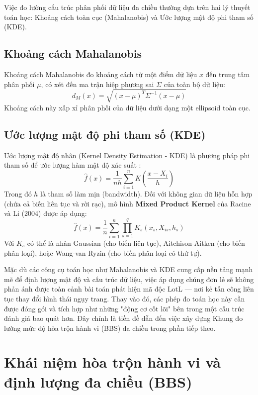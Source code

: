 \documentclass[../main.tex]{subfiles}
\begin{document}
Việc đo lường cấu trúc phân phối dữ liệu đa chiều thường dựa trên hai lý thuyết toán học: Khoảng cách toàn cục (Mahalanobis) và Ước lượng mật độ phi tham số (KDE).

\subsection{Khoảng cách Mahalanobis}
Khoảng cách Mahalanobis đo khoảng cách từ một điểm dữ liệu $x$ đến trung tâm phân phối $\mu$, có xét đến ma trận hiệp phương sai $\Sigma$ của toàn bộ dữ liệu:
\begin{equation}
    d_M(x) = \sqrt{(x - \mu)^T \Sigma^{-1} (x - \mu)}
\end{equation}
Khoảng cách này xấp xỉ phân phối của dữ liệu dưới dạng một ellipsoid toàn cục.

\subsection{Ước lượng mật độ phi tham số (KDE)}
Ước lượng mật độ nhân (Kernel Density Estimation - KDE) là phương pháp phi tham số để ước lượng hàm mật độ xác suất \cite{silverman1986density}:
\begin{equation}
    \hat{f}(x) = \frac{1}{nh} \sum_{i=1}^{n} K\left( \frac{x - X_i}{h} \right)
\end{equation}
Trong đó $h$ là tham số làm mịn (bandwidth). Đối với không gian dữ liệu hỗn hợp (chứa cả biến liên tục và rời rạc), mô hình \textbf{Mixed Product Kernel} của Racine và Li (2004) \cite{racine2004nonparametric} được áp dụng:
\begin{equation}
    \hat{f}(x) = \frac{1}{n} \sum_{i=1}^{n} \prod_{s=1}^{q} K_s(x_s, X_{is}, h_s)
\end{equation}
Với $K_s$ có thể là nhân Gaussian (cho biến liên tục), Aitchison-Aitken (cho biến phân loại), hoặc Wang-van Ryzin (cho biến phân loại có thứ tự).

Mặc dù các công cụ toán học như Mahalanobis và KDE cung cấp nền tảng mạnh mẽ để định lượng mật độ và cấu trúc dữ liệu, việc áp dụng chúng đơn lẻ sẽ không phản ánh được toàn cảnh bài toán phát hiện mã độc LotL — nơi kẻ tấn công liên tục thay đổi hình thái ngụy trang. Thay vào đó, các phép đo toán học này cần được đóng gói và tích hợp như những "động cơ cốt lõi" bên trong một cấu trúc đánh giá bao quát hơn. Đây chính là tiền đề dẫn đến việc xây dựng Khung đo lường mức độ hòa trộn hành vi (BBS) đa chiều trong phần tiếp theo.

\section{Khái niệm hòa trộn hành vi và định lượng đa chiều (BBS)}
\label{section:1.7}
\end{document}
